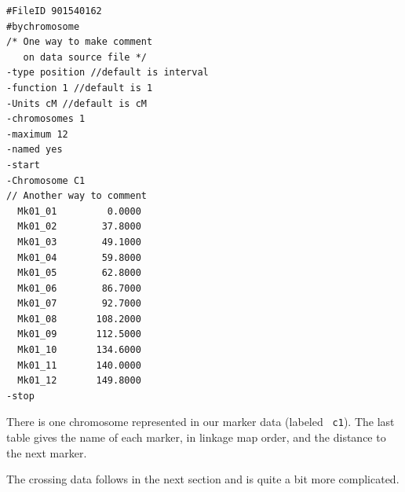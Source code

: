 \documentclass[12pt]{article}
\begin{document}
{\small
\begin{verbatim}
#FileID 901540162
#bychromosome
/* One way to make comment
   on data source file */
-type position //default is interval
-function 1 //default is 1
-Units cM //default is cM
-chromosomes 1
-maximum 12 
-named yes
-start
-Chromosome C1
// Another way to comment
  Mk01_01         0.0000
  Mk01_02        37.8000
  Mk01_03        49.1000
  Mk01_04        59.8000
  Mk01_05        62.8000
  Mk01_06        86.7000
  Mk01_07        92.7000
  Mk01_08       108.2000
  Mk01_09       112.5000
  Mk01_10       134.6000
  Mk01_11       140.0000
  Mk01_12       149.8000
-stop

\end{verbatim}
}

There is one chromosome represented in our marker data (labeled {\tt
c1}). The last table gives the name of each marker, in linkage map
order, and the distance to the next marker.

The crossing data follows in the next section and is quite a bit more
complicated.
\end{document}
